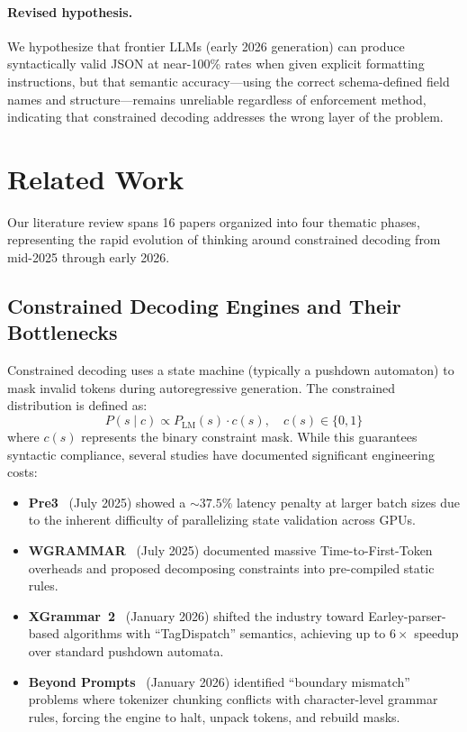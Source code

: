 \documentclass[11pt, letterpaper]{article}
\begin{document}
\paragraph{Revised hypothesis.} We hypothesize that frontier LLMs (early 2026 generation) can produce syntactically valid JSON at near-100\% rates when given explicit formatting instructions, but that semantic accuracy---using the correct schema-defined field names and structure---remains unreliable regardless of enforcement method, indicating that constrained decoding addresses the wrong layer of the problem.

\section{Related Work}
\label{sec:related_work}

Our literature review spans 16 papers organized into four thematic phases, representing the rapid evolution of thinking around constrained decoding from mid-2025 through early 2026.

\subsection{Constrained Decoding Engines and Their Bottlenecks}
\label{sec:cd_bottlenecks}

Constrained decoding uses a state machine (typically a pushdown automaton) to mask invalid tokens during autoregressive generation. The constrained distribution is defined as:
\begin{equation}
    P(s \mid c) \propto P_{\text{LM}}(s) \cdot c(s), \quad c(s) \in \{0, 1\}
    \label{eq:constrained_decoding}
\end{equation}
where $c(s)$ represents the binary constraint mask. While this guarantees syntactic compliance, several studies have documented significant engineering costs:

\begin{itemize}[leftmargin=*]
    \item \textbf{Pre3}~\cite{pre3} (July 2025) showed a ${\sim}37.5\%$ latency penalty at larger batch sizes due to the inherent difficulty of parallelizing state validation across GPUs.
    \item \textbf{WGRAMMAR}~\cite{wgrammar} (July 2025) documented massive Time-to-First-Token overheads and proposed decomposing constraints into pre-compiled static rules.
    \item \textbf{XGrammar~2}~\cite{xgrammar2} (January 2026) shifted the industry toward Earley-parser-based algorithms with ``TagDispatch'' semantics, achieving up to $6\times$ speedup over standard pushdown automata.
    \item \textbf{Beyond Prompts}~\cite{beyond_prompts} (January 2026) identified ``boundary mismatch'' problems where tokenizer chunking conflicts with character-level grammar rules, forcing the engine to halt, unpack tokens, and rebuild masks.
\end{itemize}
\end{document}
